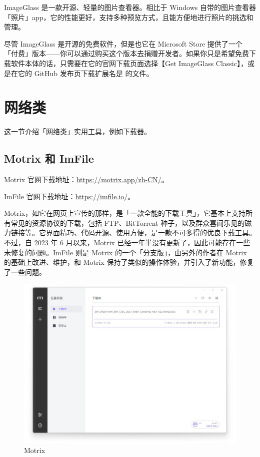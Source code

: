 ImageGlass 是一款开源、轻量的图片查看器。相比于 Windows 自带的图片查看器「照片」app，它的性能更好，支持多种预览方式，且能方便地进行照片的挑选和管理。

尽管 ImageGlass 是开源的免费软件，但是也它在 Microsoft Store 提供了一个「付费」版本——你可以通过购买这个版本去捐赠开发者。如果你只是希望免费下载软件本体的话，只需要在它的官网下载页面选择【Get ImageGlass Classic】，或是在它的 GitHub 发布页下载扩展名是  的文件。

\section{网络类}

这一节介绍「网络类」实用工具，例如下载器。

\subsection{Motrix 和 ImFile}

Motrix 官网下载地址：\url{https://motrix.app/zh-CN/}。

ImFile 官网下载地址：\url{https://imfile.io/}。

Motrix，如它在网页上宣传的那样，是「一款全能的下载工具」，它基本上支持所有常见的资源协议的下载，包括 FTP、BitTorrent 种子，以及群众喜闻乐见的磁力链接等。它界面精巧、代码开源、使用方便，是一款不可多得的优良下载工具。不过，自 2023 年 6 月以来，Motrix 已经一年半没有更新了，因此可能存在一些未修复的问题。ImFile 则是 Motrix 的一个「分支版」，由另外的作者在 Motrix 的基础上改进、维护，和 Motrix 保持了类似的操作体验，并引入了新功能，修复了一些问题。

\begin{figure}[htb!]
  \centering
  \includegraphics[width=.7\textwidth]{assets/software/Motrix.png}
  \caption{Motrix}
  \label{fig:Motrix}
\end{figure}

